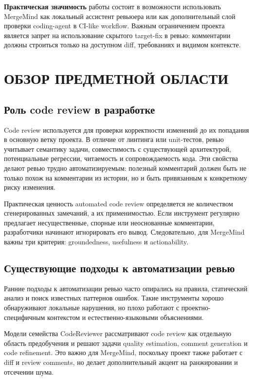 \documentclass[14pt,a4paper]{extreport}
\begin{document}
\textbf{Практическая значимость} работы состоит в возможности использовать
MergeMind как локальный ассистент ревьюера или как дополнительный слой проверки
coding-agent в CI-like workflow. Важным ограничением проекта является запрет на
использование скрытого target-fix в ревью: комментарии должны строиться только
на доступном diff, требованиях и видимом контексте.

\chapter{ОБЗОР ПРЕДМЕТНОЙ ОБЛАСТИ}

\section{Роль code review в разработке}

Code review используется для проверки корректности изменений до их попадания в
основную ветку проекта. В отличие от линтинга или unit-тестов, ревью учитывает
семантику задачи, совместимость с существующей архитектурой, потенциальные
регрессии, читаемость и сопровождаемость кода. Эти свойства делают ревью
трудно автоматизируемым: полезный комментарий должен быть не только похож на
комментарии из истории, но и быть привязанным к конкретному риску изменения.

Практическая ценность automated code review определяется не количеством
сгенерированных замечаний, а их применимостью. Если инструмент регулярно
предлагает несущественные, спорные или неоснованные комментарии, разработчики
начинают игнорировать его вывод. Следовательно, для MergeMind важны три
критерия: groundedness, usefulness и actionability.

\section{Существующие подходы к автоматизации ревью}

Ранние подходы к автоматизации ревью часто опирались на правила, статический
анализ и поиск известных паттернов ошибок. Такие инструменты хорошо обнаруживают
локальные нарушения, но плохо работают с проектно-специфичным контекстом и
естественно-языковыми объяснениями.

Модели семейства CodeReviewer рассматривают code review как отдельную область
предобучения и решают задачи quality estimation, comment generation и code
refinement. Это важно для MergeMind, поскольку проект также работает с diff и
review comments, но делает дополнительный акцент на ранжировании и отсечении
шума.
\end{document}
